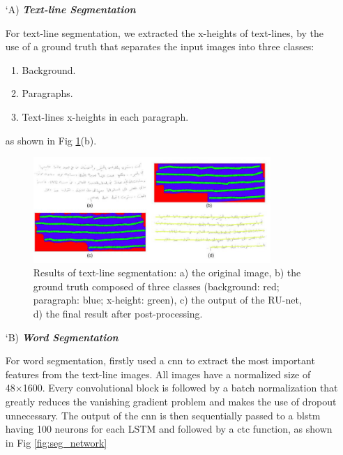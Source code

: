 \begin{itemize}[labelindent=1em,labelsep=0.25cm,leftmargin=*]
         \item[\char `A)] \textit{\textbf{Text-line Segmentation}} 
         
        For text-line segmentation, we extracted the x-heights of
        text-lines, by the use of a ground truth that separates the input images into three classes:
        \begin{enumerate}
            \item Background.
            \item Paragraphs.
            \item Text-lines x-heights in each paragraph.
        \end{enumerate}
        as shown in Fig \ref{fig:result_of_line}(b).
        
        \begin{figure}[!htb]
            \centering
            \includegraphics[width=9cm]{images/result_of_line.png}
            \caption{Results of text-line segmentation: a) the original image, b) the ground truth composed of three classes (background: red; paragraph: blue; x-height: green), c) the output of the RU-net, d) the final result after post-processing.}
            \label{fig:result_of_line}
        \end{figure}
        
        \item[\char `B)] \textit{\textbf{Word Segmentation}}
        
        For word segmentation, firstly used a \acrshort{cnn} to extract the most important features from the text-line images. All images have a normalized size of 48×1600. Every convolutional block is followed by a batch normalization that greatly reduces the vanishing gradient problem and makes the use of dropout unnecessary. The output of the \acrshort{cnn} is then sequentially passed to a \acrshort{blstm} having 100 neurons for each LSTM and followed by a \acrshort{ctc} function, as shown in Fig \ref{fig:seg_network}
        

\end{itemize}
